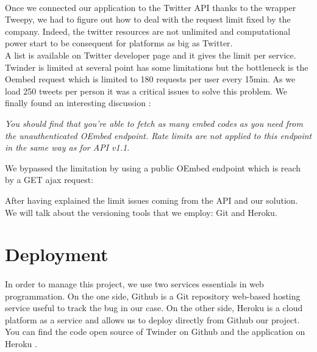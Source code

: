  \paragraph{}
Once we connected our application to the Twitter API thanks to the wrapper Tweepy, we had to figure out how to deal with the request limit fixed by the company. Indeed, the twitter resources are not unlimited and computational power start to be consequent for platforms as big as Twitter. \\
A list is available on Twitter developer page \cite{t_rate_limit} and it gives the limit per service. Twinder is limited at several point has some limitations but the bottleneck is the Oembed request which is limited to 180 requests per user every 15min. As we load 250 tweets per person it was a critical issues to solve this problem. We finally found an interesting discussion \cite{t_oembed2}:

\textit{You should find that you're able to fetch as many embed codes as you need from the unauthenticated OEmbed endpoint. Rate limits are not applied to this endpoint in the same way as for API v1.1.}

We bypassed the limitation by using a public OEmbed endpoint which is reach by a GET ajax request:

 


After having explained the limit issues coming from the API and our solution. We will talk about the versioning tools that we employ: Git and Heroku.

 \section{Deployment}
 
  \paragraph{}
 In order to manage this project, we use two services essentials in web programmation. On the one side, Github is a Git repository web-based hosting service useful to track the bug in our case. On the other side, Heroku is a cloud platform as a service and allows us to deploy directly from Github our project.
You can find the code open source of Twinder on Github \cite{tw_github} and the application on Heroku \cite{tw_heroku}.




